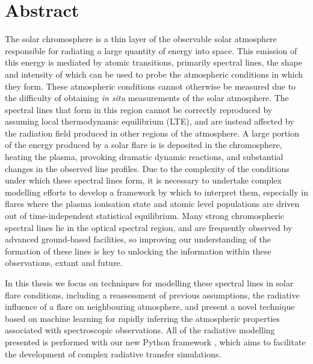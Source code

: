 \chapter{Abstract}

The solar chromosphere is a thin layer of the observable solar atmosphere responsible for radiating a large quantity of energy into space.
This emission of this energy is mediated by atomic transitions, primarily spectral lines, the shape and intensity of which can be used to probe the atmospheric conditions in which they form.
These atmospheric conditions cannot otherwise be measured due to the difficulty of obtaining \emph{in situ} measurements of the solar atmosphere.
The spectral lines that form in this region cannot be correctly reproduced by assuming local thermodynamic equilibrium (LTE), and are instead affected by the radiation field produced in other regions of the atmosphere.
A large portion of the energy produced by a solar flare is is deposited in the chromosphere, heating the plasma, provoking dramatic dynamic reactions, and substantial changes in the observed line profiles.
Due to the complexity of the conditions under which these spectral lines form, it is necessary to undertake complex modelling efforts to develop a framework by which to interpret them, especially in flares where the plasma ionisation state and atomic level populations are driven out of time-independent statistical equilibrium.
Many strong chromospheric spectral lines lie in the optical spectral region, and are frequently observed by advanced ground-based facilities, so improving our understanding of the formation of these lines is key to unlocking the information within these observations, extant and future.

In this thesis we focus on techniques for modelling these spectral lines in solar flare conditions, including a reassessment of previous assumptions, the radiative influence of a flare on neighbouring atmosphere, and present a novel technique based on machine learning for rapidly inferring the atmospheric properties associated with spectroscopic observations.
All of the radiative modelling presented is performed with our new Python framework \Lw{}, which aims to facilitate the development of complex radiative transfer simulations.

